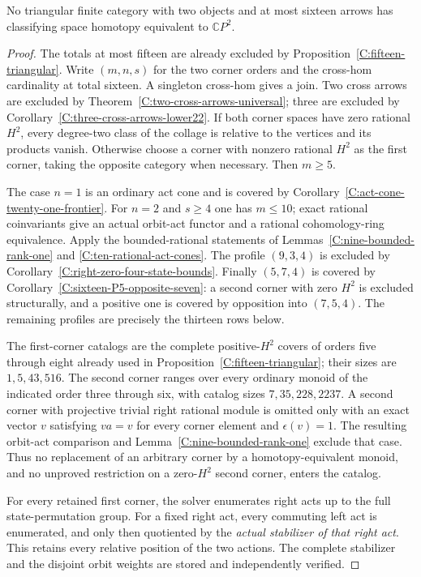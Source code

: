 \begin{proposition}\label{C:sixteen-triangular}
No triangular finite category with two objects and at most
sixteen arrows has classifying space homotopy equivalent to
$\mathbb CP^2$.
\end{proposition}
\begin{proof}
The totals at most fifteen are already excluded by
Proposition~\ref{C:fifteen-triangular}.  Write $(m,n,s)$ for
the two corner orders and the cross-hom cardinality at total
sixteen.  A singleton cross-hom gives a join.  Two cross arrows
are excluded by Theorem~\ref{C:two-cross-arrows-universal}; three
are excluded by Corollary~\ref{C:three-cross-arrows-lower22}.
If both corner spaces have zero rational $H^2$, every degree-two
class of the collage is relative to the vertices and its products
vanish.  Otherwise choose a corner with nonzero rational $H^2$
as the first corner, taking the opposite category when necessary.
Then $m\geq5$.

The case $n=1$ is an ordinary act cone and is covered by
Corollary~\ref{C:act-cone-twenty-one-frontier}.
For $n=2$ and $s\geq4$ one has $m\leq10$; exact rational
coinvariants give an actual orbit-act functor and a rational
cohomology-ring equivalence.  Apply the bounded-rational
statements of Lemmas~\ref{C:nine-bounded-rank-one} and
\ref{C:ten-rational-act-cones}.  The profile $(9,3,4)$ is
excluded by Corollary~\ref{C:right-zero-four-state-bounds}.
Finally $(5,7,4)$ is covered by
Corollary~\ref{C:sixteen-P5-opposite-seven}: a second corner
with zero $H^2$ is excluded structurally, and a positive one is
covered by opposition into $(7,5,4)$.
The remaining profiles are precisely the thirteen rows below.

The first-corner catalogs are the complete positive-$H^2$
covers of orders five through eight already used in
Proposition~\ref{C:fifteen-triangular}; their sizes are
$1,5,43,516$.  The second corner ranges over every ordinary
monoid of the indicated order three through six, with catalog
sizes $7,35,228,2237$.  A second corner with projective trivial
right rational module is omitted only with an exact vector
$v$ satisfying $va=v$ for every corner element and
$\epsilon(v)=1$.  The resulting orbit-act comparison and
Lemma~\ref{C:nine-bounded-rank-one} exclude that case.
Thus no replacement of an arbitrary corner by a homotopy-equivalent
monoid, and no unproved restriction on a zero-$H^2$ second corner,
enters the catalog.

For every retained first corner, the solver enumerates right acts
up to the full state-permutation group.  For a fixed right act,
every commuting left act is enumerated, and only then quotiented
by the \emph{actual stabilizer of that right act}.
This retains every relative position of the two actions.
The complete stabilizer and the disjoint orbit weights are
stored and independently verified.


\end{proof}
